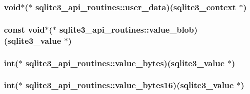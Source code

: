 \hypertarget{structsqlite3__api__routines_aa8781948e7c68d91a9c666469dca118b}{
\subsubsection[{user\-\_\-data}]{\setlength{\rightskip}{0pt plus 5cm}void$\ast$($\ast$ sqlite3\-\_\-api\-\_\-routines\-::user\-\_\-data)({\bf sqlite3\-\_\-context} $\ast$)}}\label{structsqlite3__api__routines_aa8781948e7c68d91a9c666469dca118b}
\hypertarget{structsqlite3__api__routines_a7e3904fdaa27da60c444d080331ed091}{
\subsubsection[{value\-\_\-blob}]{\setlength{\rightskip}{0pt plus 5cm}const void$\ast$($\ast$ sqlite3\-\_\-api\-\_\-routines\-::value\-\_\-blob)({\bf sqlite3\-\_\-value} $\ast$)}}\label{structsqlite3__api__routines_a7e3904fdaa27da60c444d080331ed091}
\hypertarget{structsqlite3__api__routines_a36456594eab68bf7907db9582a53ea0a}{
\subsubsection[{value\-\_\-bytes}]{\setlength{\rightskip}{0pt plus 5cm}int($\ast$ sqlite3\-\_\-api\-\_\-routines\-::value\-\_\-bytes)({\bf sqlite3\-\_\-value} $\ast$)}}\label{structsqlite3__api__routines_a36456594eab68bf7907db9582a53ea0a}
\hypertarget{structsqlite3__api__routines_a5bbfaab79c286e78fe420d96d65d7167}{
\subsubsection[{value\-\_\-bytes16}]{\setlength{\rightskip}{0pt plus 5cm}int($\ast$ sqlite3\-\_\-api\-\_\-routines\-::value\-\_\-bytes16)({\bf sqlite3\-\_\-value} $\ast$)}}\label{structsqlite3__api__routines_a5bbfaab79c286e78fe420d96d65d7167}
